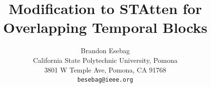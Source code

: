 \documentclass[10pt,twocolumn,letterpaper]{article}
\title{Modification to STAtten for Overlapping Temporal Blocks}
\author{Brandon Esebag\\
California State Polytechnic University, Pomona\\
3801 W Temple Ave, Pomona, CA 91768\\
{\tt\small besebag@ieee.org}}
\begin{document}
\maketitle
    






{
    \small
    
    
}

 
\end{document}
